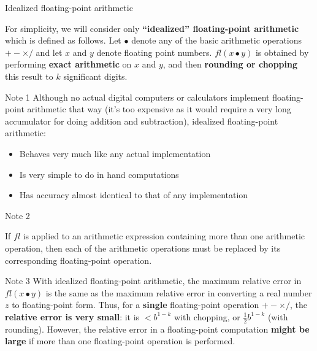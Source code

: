 \documentclass[12pt]{beamer}
\begin{document}
\begin{frame}{Idealized floating-point arithmetic} 

\begin{definition} 
For simplicity, we will consider only {\bf ``idealized'' floating-point arithmetic} which is defined as follows. Let $\bullet$ denote any of the basic arithmetic operations $+ - \times /$ and let $x$ and $y$ denote floating point numbers. $fl(x \bullet y)$ is obtained by performing {\bf exact arithmetic} on $x$ and $y$, and then {\bf rounding or chopping} this result to $k$ significant digits. 
\end{definition} 
\end{frame} 

\begin{frame}{Note 1} 
Although no actual digital computers or calculators implement floating-point arithmetic that way (it's too expensive as it would require a very long accumulator for doing addition and subtraction), idealized floating-point arithmetic: 
\begin{itemize} 
\item Behaves very much like any actual implementation 
\item Is very simple to do in hand computations 
\item Has accuracy almost identical to that of any implementation
\end{itemize} 
\end{frame}

\begin{frame}{Note 2} 

If $fl$ is applied to an arithmetic expression containing more than one arithmetic operation, then each of the arithmetic operations must be replaced by its corresponding floating-point operation.
\vspace {2 in}

\end{frame} 

\begin{frame}{Note 3}
With idealized floating-point arithmetic, the maximum relative error in $fl(x \bullet y)$ is the same as the maximum relative error in converting a real number $z$ to floating-point form. Thus, for a {\bf single} floating-point operation $+ - \times /$, the {\bf relative error is very small}: it is $ < b^{1-k}$ with chopping, or $\frac{1}{2} b^{1-k}$ (with rounding). However, the relative error in a floating-point computation {\bf might be large} if more than one floating-point operation is performed. 
\end{frame} 
\end{document}
